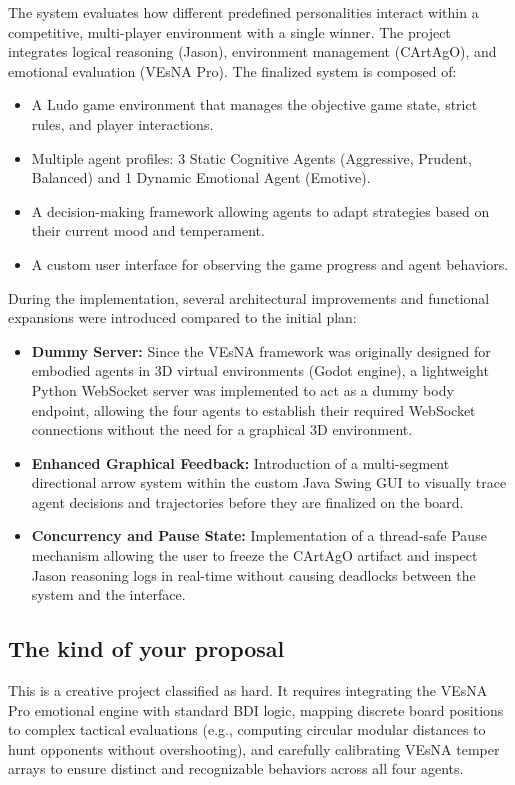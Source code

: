 \documentclass[12pt]{article}
\begin{document}
\noindent The system evaluates how different predefined personalities interact within a competitive, multi-player environment with a single winner. The project integrates logical reasoning (Jason), environment management (CArtAgO), and emotional evaluation (VEsNA Pro). The finalized system is composed of:
\begin{itemize}
    \item A Ludo game environment that manages the objective game state, strict rules, and player interactions.
    \item Multiple agent profiles: 3 Static Cognitive Agents (Aggressive, Prudent, Balanced) and 1 Dynamic Emotional Agent (Emotive).
    \item A decision-making framework allowing agents to adapt strategies based on their current mood and temperament.
    \item A custom user interface for observing the game progress and agent behaviors.
\end{itemize}


\noindent During the implementation, several architectural improvements and functional expansions were introduced compared to the initial plan:
\begin{itemize}
    \item \textbf{Dummy Server:} Since the VEsNA framework was originally designed for embodied agents in 3D virtual environments (Godot engine), a lightweight Python WebSocket server was implemented to act as a dummy body endpoint, allowing the four agents to establish their required WebSocket connections without the need for a graphical 3D environment.
    \item \textbf{Enhanced Graphical Feedback:} Introduction of a multi-segment directional arrow system within the custom Java Swing GUI to visually trace agent decisions and trajectories before they are finalized on the board.
    \item \textbf{Concurrency and Pause State:} Implementation of a thread-safe Pause mechanism allowing the user to freeze the CArtAgO artifact and inspect Jason reasoning logs in real-time without causing deadlocks between the system and the interface.
\end{itemize}

\subsection{The kind of your proposal}
\label{subsec:kind}
This is a creative project classified as hard. It requires integrating the VEsNA
Pro emotional engine with standard BDI logic, mapping discrete board positions to
complex tactical evaluations (e.g., computing circular modular distances to hunt
opponents without overshooting), and carefully calibrating VEsNA temper arrays to
ensure distinct and recognizable behaviors across all four agents.
\end{document}
